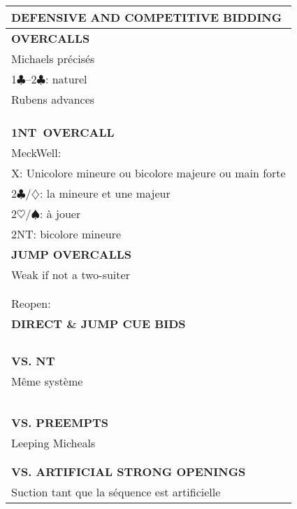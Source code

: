 \documentclass{article}
\newcommand\C{\ensuremath{\clubsuit}}
\newcommand\D{\ensuremath{\diamondsuit}}
\renewcommand\H{\ensuremath{\heartsuit}}
\renewcommand\S{\ensuremath{\spadesuit}}
\newcommand\N{{\footnotesize NT}}
\begin{document}
\noindent
\small{
\begin{minipage}{90mm}
	\begin{tabular}{| p{88mm} |}
		\hline
		\cellcolor[gray]{0.9} \textbf{DEFENSIVE AND COMPETITIVE BIDDING} \\ \hline
		\textbf{OVERCALLS} \\ \hline
		Michaels précisés\\ \hline
		1\C--2\C: naturel\\ \hline
		Rubens advances\\ \hline
		\\ \hline
		\\ \hline
		\\ \hline
		\textbf{1\N \ OVERCALL} \\ \hline
		MeckWell: \\ \hline
		X: Unicolore mineure ou bicolore majeure ou main forte\\ \hline
		2\C/\D: la mineure et une majeur\\ \hline
		2\H/\S: à jouer\\ \hline
		2\N: bicolore mineure\\ \hline
		\textbf{JUMP OVERCALLS} \\ \hline
		Weak if not a two-suiter\\ \hline
		\\ \hline
		\\ \hline
		Reopen: \\ \hline
		\textbf{DIRECT \& JUMP CUE BIDS} \\ \hline
		\\ \hline
		\\ \hline
		\\ \hline
		\\ \hline
		\textbf{VS. NT} \\ \hline
		Même système\\ \hline
		\\ \hline
		\\ \hline
		\\ \hline
		\\ \hline
		\\ \hline
		\textbf{VS. PREEMPTS} \\ \hline
		Leeping Micheals\\ \hline
		\\ \hline
		\\ \hline
		\textbf{VS. ARTIFICIAL STRONG OPENINGS} \\ \hline
		Suction tant que la séquence est artificielle\\ \hline

\end{tabular}
\end{minipage}}
\end{document}
